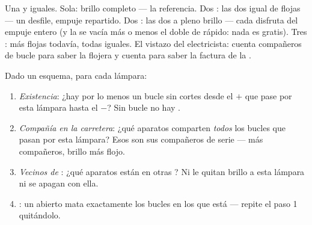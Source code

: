 \begin{example}\label{ex:g7:circuits-series-parallel:brightness}
Una  y  iguales. Sola: brillo completo --- la
referencia. Dos : las dos igual de flojas --- un desfile,
empuje repartido. Dos : las dos a pleno brillo --- cada
 disfruta del empuje entero (y la  se vacía más o
menos el doble de rápido: nada es gratis). Tres : más
flojas todavía, todas iguales. El vistazo del electricista: cuenta
compañeros de bucle para saber la flojera y cuenta  para
saber la factura de la .
\end{example}

\begin{method}\label{met:g7:circuits-series-parallel:predict}
Dado un esquema, para cada lámpara:
\begin{enumerate}
  \item \emph{Existencia}: ¿hay por lo menos un bucle sin cortes
        desde el $+$ que pase por esta lámpara hasta el $-$? Sin
        bucle no hay .
  \item \emph{Compañía en la carretera}: ¿qué aparatos comparten
        \emph{todos} los bucles que pasan por esta lámpara? Esos son
        sus compañeros de serie --- más compañeros, brillo más flojo.
  \item \emph{Vecinos de }: ¿qué aparatos están en otras
        ? Ni le quitan brillo a esta lámpara ni se apagan con
        ella.
  \item \emph{}: un  abierto mata
        exactamente los bucles en los que está --- repite el paso 1
        quitándolo.
\end{enumerate}
\end{method}

